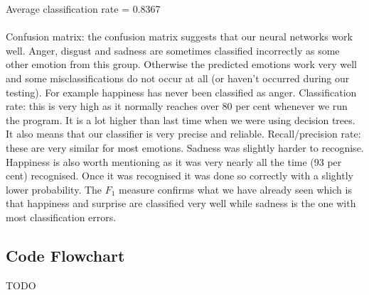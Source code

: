 \documentclass[12pt]{article}
\begin{document}
Average classification rate = 0.8367 \\ \\
Confusion matrix: the confusion matrix suggests that our neural networks work well. Anger, disgust and sadness are sometimes classified incorrectly as some other emotion from this group. Otherwise the predicted emotions work very well and some misclassifications do not occur at all (or haven't occurred during our testing). For example happiness has never been classified as anger. Classification rate: this is very high as it normally reaches over 80 per cent whenever we run the program. It is a lot higher than last time when we were using decision trees. It also means that our classifier is very precise and reliable. Recall/precision rate: these are very similar for most emotions. Sadness was slightly harder to recognise. Happiness is also worth mentioning as it was very nearly all the time (93 per cent) recognised. Once it was recognised it was done so correctly with a slightly lower probability. The $F_1$ measure confirms what we have already seen which is that happiness and surprise are classified very well while sadness is the one with most classification errors.


\newpage
\subsection*{Code Flowchart}

TODO
\end{document}
